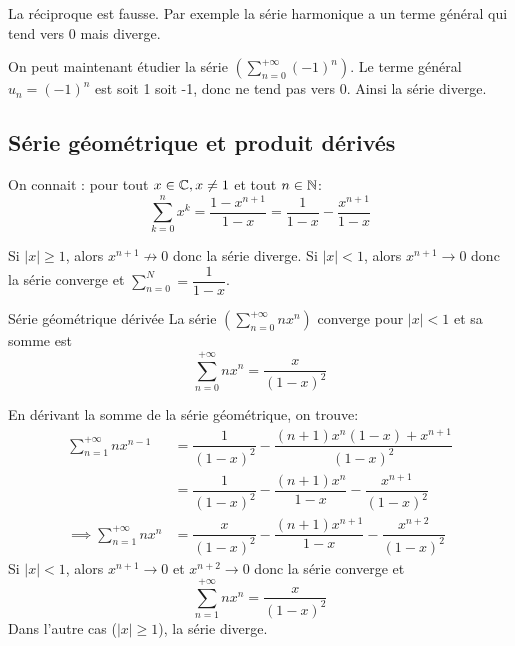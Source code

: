 \documentclass[a4paper, 12pt]{article}
\begin{document}
\begin{remarque}
    La réciproque est fausse.\n
    Par exemple la série harmonique a un terme général qui tend vers 0 mais diverge.
\end{remarque}

\begin{exemple}
    On peut maintenant étudier la série $(\sum\limits_{n=0}^{+\infty}(-1)^n)$.\n
    Le terme général $u_n = (-1)^n$ est soit 1 soit -1, donc ne tend pas vers 0.\n
    Ainsi la série diverge.
\end{exemple}

\subsection{Série géométrique et produit dérivés}

On connait : pour tout $x \in \mathbb{C}, x \neq 1$ et tout $n \in \mathbb{N}$:
$$
\sum\limits_{k=0}^{n} x^k = \dfrac{1 - x^{n+1}}{1 - x} = \dfrac{1}{1 - x} - \dfrac{x^{n+1}}{1 - x}
$$

Si $|x| \geq 1$, alors $x^{n+1} \not\rightarrow 0$ donc la série diverge.\n
Si $|x| \lt 1$, alors $x^{n+1} \rightarrow 0$ donc la série converge et $\sum\limits_{n=0}^{N} = \dfrac{1}{1 - x}$.

\begin{proposition}{Série géométrique dérivée}{}
    La série $(\sum\limits_{n=0}^{+\infty} nx^n)$ converge pour $|x| \lt 1$ et sa somme est
    $$
    \sum\limits_{n=0}^{+\infty}nx^n = \dfrac{x}{(1 - x)^2}
    $$
\end{proposition}

\begin{demonstration}
    En dérivant la somme de la série géométrique, on trouve:
    \begin{align*}
        \sum\limits_{n=1}^{+\infty}nx^{n-1} &= \dfrac{1}{(1 - x)^2} - \dfrac{(n+1)x^n(1 - x) + x^{n + 1}}{(1 - x)^2}\\
        &= \dfrac{1}{(1 - x)^2} - \dfrac{(n+1)x^n}{1 - x} - \dfrac{x^{n + 1}}{(1 - x)^2}\\
        \implies \sum\limits_{n=1}^{+\infty}nx^{n} &= \dfrac{x}{(1 - x)^2} - \dfrac{(n+1)x^{n+1}}{1 - x} - \dfrac{x^{n + 2}}{(1 - x)^2}
    \end{align*}
    Si $|x| \lt 1$, alors $x^{n+1} \rightarrow 0$ et $x^{n+2} \rightarrow 0$ donc la série converge et
    $$
    \sum\limits_{n=1}^{+\infty}nx^{n} = \dfrac{x}{(1 - x)^2}
    $$
    Dans l'autre cas ($|x| \geq 1$), la série diverge.
\end{demonstration}
\end{document}
